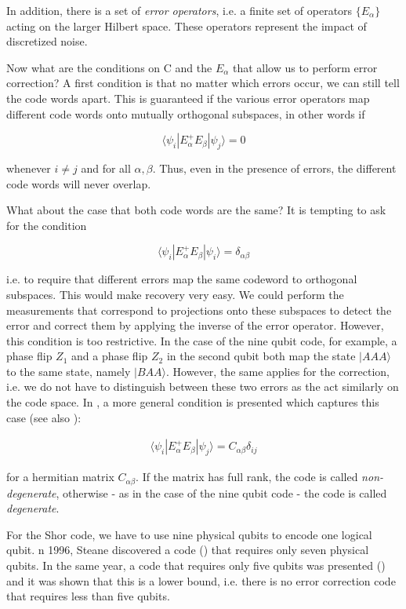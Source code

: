 \documentclass[a4paper, draft]{article}
\theoremstyle{own}
\theoremstyle{remark}
\begin{document}
In addition, there is a set of \emph{error operators}, i.e. a finite set of operators $\{ E_\alpha\}$ acting on the larger Hilbert space. These operators represent the impact of discretized noise.

Now what are the conditions on C and the $E_\alpha$ that allow us to perform error correction? A first condition is that no matter which errors occur, we can still tell the code words apart. This is guaranteed if the various error operators map different code words onto mutually orthogonal subspaces, in other words if 

$$
\langle \psi_i | E_\alpha^{+} E_\beta | \psi_j \rangle = 0 
$$

whenever $i \neq j$ and for all $\alpha, \beta$. Thus, even in the presence of errors, the different code words will never overlap. 

What about the case that both code words are the same? It is tempting to ask for the condition

$$
\langle \psi_i | E_\alpha^{+} E_\beta | \psi_i \rangle = \delta_{\alpha \beta}
$$

i.e. to require that different errors map the same codeword to orthogonal subspaces. This would make recovery very easy. We could perform the measurements that correspond to projections onto these subspaces to detect the error and correct them by applying the inverse of the error operator. However, this condition is too restrictive. In the case of the nine qubit code, for example, a phase flip $Z_1$ and a phase flip $Z_2$ in the second qubit both map the state $|AAA \rangle$ to the same state, namely $|BAA\rangle$. However, the same applies for the correction, i.e. we do not have to distinguish between these two errors as the act similarly on the code space. In \cite{KL}, a more general condition is presented which captures this case (see also \cite{G1}):

\begin{align}\label{eq:errorcorrection}
\langle \psi_i | E_\alpha^{+}E_\beta | \psi_j \rangle = C_{\alpha\beta} \delta_{ij}
\end{align}

for a hermitian matrix $C_{\alpha \beta}$. If the matrix has full rank, the code is called \emph{non-degenerate}, otherwise - as in the case of the nine qubit code - the code is called \emph{degenerate}. 

For the Shor code, we have to use nine physical qubits to encode one logical qubit. n 1996, Steane discovered a code (\cite{SteaneCode}) that  requires only seven physical qubits. In the same year, a code that requires only five qubits was presented (\cite{LMPZ96}) and it was shown that this is a lower bound, i.e. there is no error correction code that requires less than five qubits.
\end{document}
